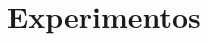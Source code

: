 \documentclass{beamer}
\begin{document}
\begin{frame}
\end{frame}

\section{Experimentos}
\end{document}
